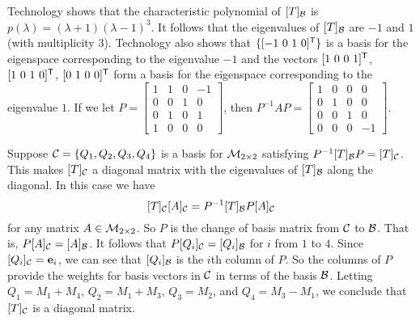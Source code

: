 \item Technology shows that the characteristic polynomial of $[T]_{\mathcal{B}}$ is $p(\lambda) = (\lambda+1)(\lambda-1)^3$. It follows that the eigenvalues of $[T]_{\mathcal{B}}$ are $-1$ and $1$ (with multiplicity $3$). Technology also shows that $\{[-1 \ 0 \ 1 \ 0]^{\tr}\}$ is a basis for the eigenspace corresponding to the eigenvalue $-1$ and the vectors $[1 \ 0 \ 0 \ 1]^{\tr}$, $[1 \ 0 \ 1 \ 0]^{\tr}$, $[0 \ 1 \ 0 \ 0]^{\tr}$ form a basis for the eigenspace corresponding to the eigenvalue $1$. If we let $P = \left[ \begin{array}{cccr} 1&1&0&-1 \\ 0&0&1&0 \\ 0&1&0&1 \\ 1&0&0&0 \end{array} \right]$, then $P^{-1}AP = \left[ \begin{array}{cccr} 1&0&0&0 \\ 0&1&0&0 \\ 0&0&1&0 \\ 0&0&0&-1 \end{array} \right]$.

\item Suppose $\mathcal{C} = \{Q_1, Q_2, Q_3, Q_4\}$ is a basis for $\mathcal{M}_{2 \times 2}$ satisfying $P^{-1}[T]_{\mathcal{B}}P = [T]_{\mathcal{C}}$. This makes $[T]_{\mathcal{C}}$ a diagonal matrix with the eigenvalues of $[T]_{\mathcal{B}}$ along the diagonal. In this case we have 
\[[T]_{\mathcal{C}}[A]_{\mathcal{C}} = P^{-1}[T]_{\mathcal{B}}P[A]_{\mathcal{C}}\]
for any matrix $A \in \mathcal{M}_{2 \times 2}$. So $P$ is the change of basis matrix from $\mathcal{C}$ to $\mathcal{B}$. That is, $P[A]_{\mathcal{C}} = [A]_{\mathcal{B}}$. It follows that $P[Q_i]_{\mathcal{C}} = [Q_i]_{\mathcal{B}}$ for $i$ from $1$ to $4$. Since $[Q_i]_{\mathcal{C}} = \mathbf{e}_i$, we can see that $[Q_i]_{\mathcal{B}}$ is the $i$th column of $P$. So the  columns of $P$ provide the weights for basis vectors in $\mathcal{C}$ in terms of the basis $\mathcal{B}$. Letting $Q_1 = M_1+M_4$, $Q_2 = M_1+M_3$, $Q_3=M_2$, and $Q_4 = M_3-M_1$, we conclude that $[T]_{\mathcal{C}}$ is a diagonal matrix. 

\ea


